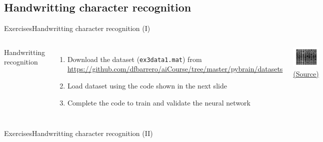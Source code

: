 \documentclass[10pt,compress]{beamer} %
\begin{document}
\subsection{Handwritting character recognition}
\begin{frame}{Exercises}{Handwritting character recognition (I)}
   \begin{columns}
	Handwritting recognition
	\begin{enumerate}
		\item Download the dataset (\texttt{ex3data1.mat}) from \url{https://github.com/dfbarrero/aiCourse/tree/master/pybrain/datasets}
		\item Load dataset using the code shown in the next slide
		\item Complete the code to train and validate the neural network
	\end{enumerate}
		\begin{center}
		\includegraphics[width=\linewidth]{figs/hand.png}\\
	    \href{http://sujitpal.blogspot.com.es/2014/07/handwritten-digit-recognition-with.html}{(Source)}
		\end{center}
		\end{columns}
\end{frame}

\begin{frame}{Exercises}{Handwritting character recognition (II)}
    	\begin{block}{}
       \vspace{-0.2cm}
       
       \vspace{-0.2cm}
    	\end{block}
\end{frame}
\end{document}
